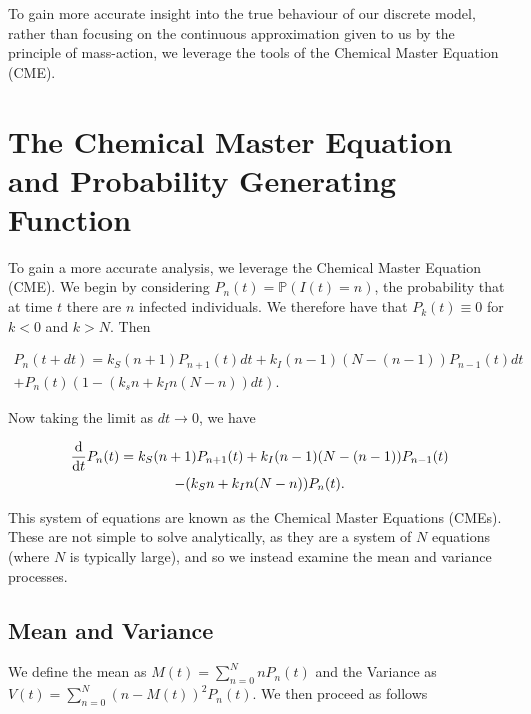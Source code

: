 \documentclass[12pt,a4paper,openany,twoside]{book}
\renewcommand{\d}{{\mathrm d}}
\newcommand{\fd}[2]{\mathchoice{\frac{\d #1}{\d #2}}{\d #1/\d #2}{\d #1/\d #2}{\d #1/\d #2}}
\begin{document}
To gain more accurate insight into the true behaviour of our discrete model, rather than focusing on the continuous approximation given to us by the principle of mass-action, we leverage the tools of the Chemical Master Equation (CME).

\section{The Chemical Master Equation and Probability Generating Function}

To gain a more accurate analysis, we leverage the Chemical Master Equation (CME). We begin by considering $P_n (t) = \mathbb{P}(I(t) = n)$, the probability that at time $t$ there are $n$ infected individuals. We therefore have that $P_k (t) \equiv 0$ for $k < 0$ and $k > N$. Then

\begin{multline}
	P_n(t + dt) = k_S (n+1) P_{n+1}(t) dt + k_I (n-1) (N- (n-1)) P_{n-1}(t) dt \\
	+ P_n(t) (1 - (k_s n + k_I n (N-n)) dt).
\end{multline}

Now taking the limit as $dt \rightarrow 0$, we have

\begin{multline}
	\fd {} {t} P_n(t) = k_S (n+1) P_{n+1}(t) + k_I (n-1) (N- (n-1)) P_{n-1}(t) \\
	 - (k_S n + k_I n (N-n)) P_n(t). \label{WMCME}
\end{multline}

This system of equations are known as the Chemical Master Equations (CMEs). These are not simple to solve analytically, as they are a system of $N$ equations (where $N$ is typically large), and so we instead examine the mean and variance processes.

\subsection{Mean and Variance} \label{MeanVar}

We define the mean as $M(t) = \sum_{n = 0}^N n P_n(t)$ and the Variance as $V(t) = \sum_{n = 0}^N (n - M(t))^2 P_n(t)$. We then proceed as follows
\end{document}
